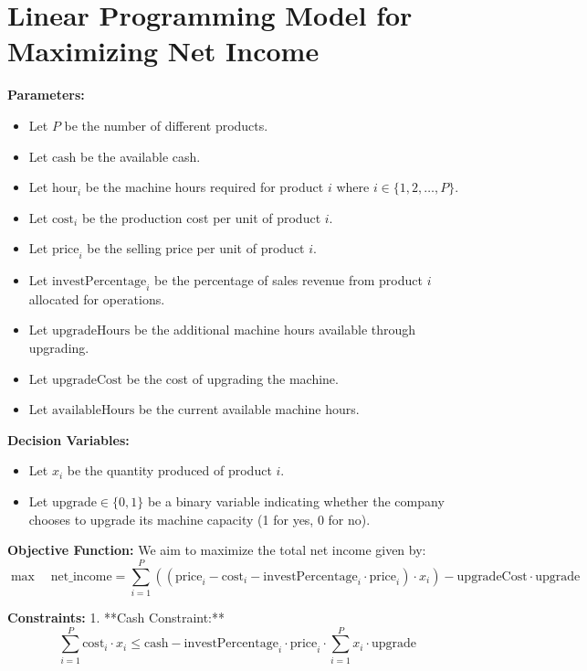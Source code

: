\documentclass{article}
\begin{document}
\section*{Linear Programming Model for Maximizing Net Income}

\textbf{Parameters:}
\begin{itemize}
    \item Let \( P \) be the number of different products.
    \item Let \( \text{cash} \) be the available cash.
    \item Let \( \text{hour}_i \) be the machine hours required for product \( i \) where \( i \in \{1, 2, \ldots, P\} \).
    \item Let \( \text{cost}_i \) be the production cost per unit of product \( i \).
    \item Let \( \text{price}_i \) be the selling price per unit of product \( i \).
    \item Let \( \text{investPercentage}_i \) be the percentage of sales revenue from product \( i \) allocated for operations.
    \item Let \( \text{upgradeHours} \) be the additional machine hours available through upgrading.
    \item Let \( \text{upgradeCost} \) be the cost of upgrading the machine.
    \item Let \( \text{availableHours} \) be the current available machine hours.
\end{itemize}

\textbf{Decision Variables:}
\begin{itemize}
    \item Let \( x_i \) be the quantity produced of product \( i \).
    \item Let \( \text{upgrade} \in \{0, 1\} \) be a binary variable indicating whether the company chooses to upgrade its machine capacity (1 for yes, 0 for no).
\end{itemize}

\textbf{Objective Function:}
We aim to maximize the total net income given by:
\[
\max \quad \text{net\_income} = \sum_{i=1}^{P} \left( ( \text{price}_i - \text{cost}_i - \text{investPercentage}_i \cdot \text{price}_i ) \cdot x_i \right) - \text{upgradeCost} \cdot \text{upgrade}
\]

\textbf{Constraints:}
1. **Cash Constraint:**
\[
\sum_{i=1}^{P} \text{cost}_i \cdot x_i \leq \text{cash} - \text{investPercentage}_i \cdot \text{price}_i \cdot \sum_{i=1}^{P} x_i \cdot \text{upgrade}
\]
\end{document}
